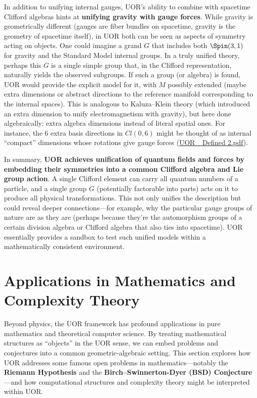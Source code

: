 \documentclass[12pt]{article}
\begin{document}
\medskip

In addition to unifying internal gauges, UOR’s ability to combine with spacetime Clifford algebras hints at \textbf{unifying gravity with gauge forces}. While gravity is geometrically different (gauges are fiber bundles on spacetime, gravity is the geometry of spacetime itself), in UOR both can be seen as aspects of symmetry acting on objects. One could imagine a grand $G$ that includes both $\Spin(3,1)$ for gravity and the Standard Model internal groups. In a truly unified theory, perhaps this $G$ is a single simple group that, in the Clifford representation, naturally yields the observed subgroups. If such a group (or algebra) is found, UOR would provide the explicit model for it, with $M$ possibly extended (maybe extra dimensions or abstract directions to the reference manifold corresponding to the internal spaces). This is analogous to Kaluza--Klein theory (which introduced an extra dimension to unify electromagnetism with gravity), but here done algebraically: extra algebra dimensions instead of literal spatial ones. For instance, the 6 extra basis directions in $Cl(0,6)$ might be thought of as internal ``compact'' dimensions whose rotations give gauge forces (\href{file://file-TBF3nHDaRR5QeVMmwCFYkp#:~:text=Cosmo%20Const%20Proof%20Supp1,Such%20an%20approach%20aligns%20with}{UOR\_ Defined 2.pdf}).

\medskip

In summary, \textbf{UOR achieves unification of quantum fields and forces by embedding their symmetries into a common Clifford algebra and Lie group action}. A single Clifford element can carry all quantum numbers of a particle, and a single group $G$ (potentially factorable into parts) acts on it to produce all physical transformations. This not only unifies the description but could reveal deeper connections---for example, why the particular gauge groups of nature are as they are (perhaps because they’re the automorphism groups of a certain division algebra or Clifford algebra that also ties into spacetime). UOR essentially provides a sandbox to test such unified models within a mathematically consistent environment.

\section{Applications in Mathematics and Complexity Theory}

Beyond physics, the UOR framework has profound applications in pure mathematics and theoretical computer science. By treating mathematical structures as “objects” in the UOR sense, we can embed problems and conjectures into a common geometric-algebraic setting. This section explores how UOR addresses some famous open problems in mathematics---notably the \textbf{Riemann Hypothesis} and the \textbf{Birch--Swinnerton-Dyer (BSD) Conjecture}---and how computational structures and complexity theory might be interpreted within UOR.
\end{document}

